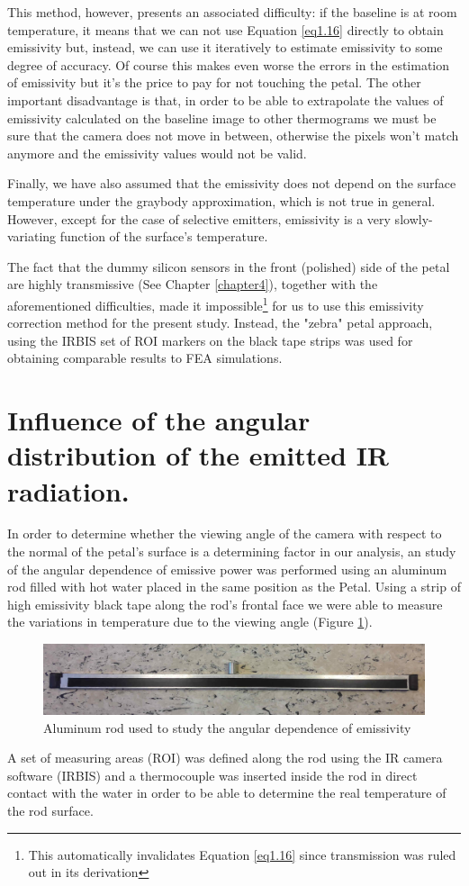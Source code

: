 		This method, however, presents an associated difficulty: if the baseline is at room temperature, it means that we can not use Equation \ref{eq1.16} directly to obtain emissivity but, instead, we can use it iteratively to estimate emissivity to some degree of accuracy. Of course this makes even worse the errors in the estimation of emissivity but it’s the price to pay for not touching the petal. The other important disadvantage is that, in order to be able to extrapolate the values of emissivity calculated on the baseline image to other thermograms we must be sure that the camera does not move in between, otherwise the pixels won’t match anymore and the emissivity values would not be valid.
		
		Finally, we have also assumed that the emissivity does not depend on the surface temperature under the graybody approximation, which is not true in general. However, except for the case of selective emitters, emissivity is a very slowly-variating function of the surface’s temperature.
		
		The fact that the dummy silicon sensors in the front (polished) side of the petal are highly transmissive (See Chapter \ref{chapter4}), together with the aforementioned difficulties, made it impossible\footnote{{\footnotesize This automatically invalidates Equation \ref{eq1.16} since transmission was ruled out in its derivation}} for us to use this emissivity correction method for the present study. Instead, the "zebra" petal approach, using the IRBIS set of ROI markers on the black tape strips was used for obtaining comparable results to FEA simulations.\bigskip
		
	\section{Influence of the angular distribution of the emitted IR radiation.}\label{section3.4}
	
		In order to determine whether the viewing angle of the camera with respect to the normal of the petal's surface is a determining factor in our analysis, an study of the angular dependence of emissive power was performed using an aluminum rod filled with hot water placed in the same position as the Petal. Using a strip of high emissivity black tape along the rod’s frontal face we were able to measure the variations in temperature due to the viewing angle (Figure \ref{fig3.4}).
	
		\begin{figure}[H]
			\centering
			\captionsetup{justification=centering,margin=2cm}
			\includegraphics[scale=0.30]{Figures/Chapter03/AluminumRod.jpg}
			\caption{Aluminum rod used to study the angular dependence of emissivity}\label{fig3.4}
		\end{figure}		
		
		A set of measuring areas (ROI) was defined along the rod using the IR camera software (IRBIS) and a thermocouple was inserted inside the rod in direct contact with the water in order to be able to determine the real temperature of the rod surface.
	
	